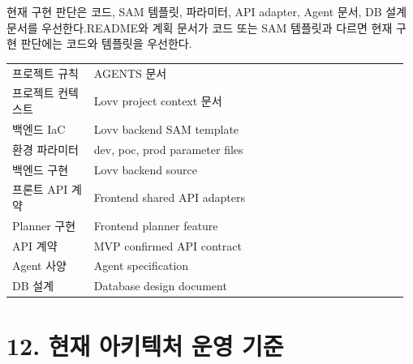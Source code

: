 \documentclass[12pt,a4paper]{article}
\newcommand{\DocNeedspace}[1]{\par\ifdim\dimexpr\pagegoal-\pagetotal\relax<#1\newpage\fi}
\renewcommand{\arraystretch}{1.35}
\newcommand{\TocNoChildTight}{\vspace{-0.28em}}
\begin{document}
\DocNeedspace{3\baselineskip}
현재 구현 판단은 코드, SAM 템플릿, 파라미터, API adapter, Agent 문서, DB 설계 문서를 우선한다.\newline README와 계획 문서가 코드 또는 SAM 템플릿과 다르면 현재 구현 판단에는 코드와 템플릿을 우선한다.


\DocNeedspace{26\baselineskip}
\begin{small}
\setlength{\tabcolsep}{3pt}
\setlength{\extrarowheight}{1pt}
\renewcommand{\arraystretch}{1.46}
\begin{longtable}{@{}>{\RaggedRight\arraybackslash}m{0.200\linewidth}>{\RaggedRight\arraybackslash}m{0.772\linewidth}@{}}
\toprule
\multicolumn{1}{>{\centering\arraybackslash}m{0.200\linewidth}}{\textbf{구분}} & \multicolumn{1}{>{\centering\arraybackslash}m{0.772\linewidth}}{\textbf{기준 문서/구현}} \\
\midrule
\endhead
프로젝트 규칙 & AGENTS 문서 \\
프로젝트 컨텍스트 & Lovv project context 문서 \\
백엔드 IaC & Lovv backend SAM template \\
환경 파라미터 & dev, poc, prod parameter files \\
백엔드 구현 & Lovv backend source \\
프론트 API 계약 & Frontend shared API adapters \\
Planner 구현 & Frontend planner feature \\
API 계약 & MVP confirmed API contract \\
Agent 사양 & Agent specification \\
DB 설계 & Database design document \\
\bottomrule
\end{longtable}
\end{small}


\newpage

\DocNeedspace{10\baselineskip}
\section*{12. 현재 아키텍처 운영 기준}
\addtocontents{toc}{\protect\TocNoChildTight}
\end{document}
